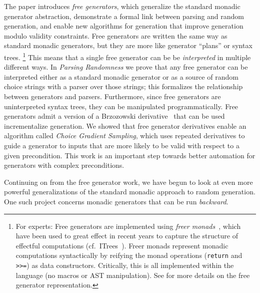 The paper introduces {\em free generators}, which generalize the standard
monadic generator abstraction, demonstrate a formal link between parsing and
random generation, and enable new algorithms for generation that improve
generation modulo validity constraints. Free generators are written the same
way as standard monadic generators, but they are more like generator ``plans''
or syntax trees.%
\footnote{For experts: Free generators are implemented using {\em freer
monads}~\cite{kiselyov2015freer}, which have been used to great effect in recent
years to capture the structure of effectful computations
(cf.~ITrees~\cite{old:xia2019interaction}). Freer monads represent
monadic computations syntactically by reifying the monad operations
(\lstinline{return} and \lstinline{>>=}) as data constructors. Critically, this
is all implemented within the language (no macros or AST
manipulation). See \cite{goldstein2022parsing} for more details on the
free generator representation.}
This means that a single free generator can be be {\em interpreted} in multiple
different ways. In {\em Parsing Randomness} we prove that any free generator can
be interpreted either as a standard monadic generator or as a source of
random choice strings with a parser over those strings; this formalizes the
relationship between generators and parsers. Furthermore, since free generators
are uninterpreted syntax trees, they can be manipulated programmatically. Free
generators admit a version of a Brzozowski
derivative~\cite{brzozowski1964derivatives} that can be used incrementalize
generation. We showed that free generator derivatives enable an algorithm called
{\em Choice Gradient Sampling}, which uses repeated derivatives to guide a
generator to inputs that are more likely to be valid with respect to a given
precondition. This work is an important step towards better automation for
generators with complex preconditions.

Continuing on from the free generator work, we have begun to look at even more
powerful generalizations of the standard monadic approach to random generation.
One such project concerns monadic generators
that can be run {\em backward}.

